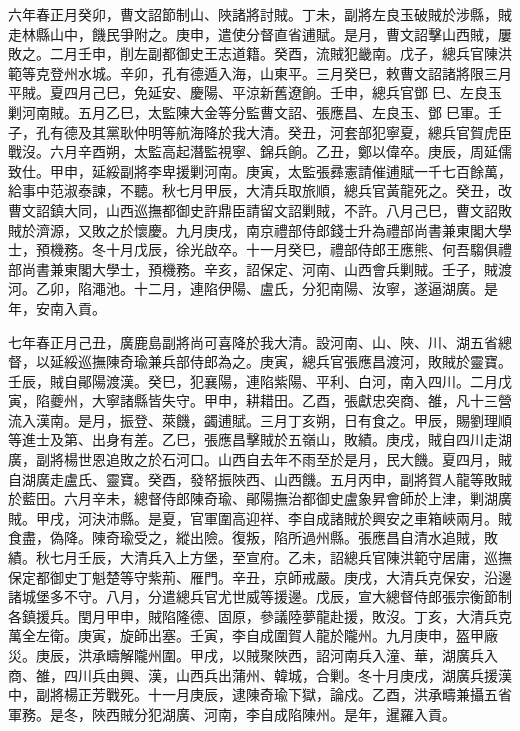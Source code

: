 \begin{pinyinscope}
六年春正月癸卯，曹文詔節制山、陜諸將討賊。丁未，副將左良玉破賊於涉縣，賊走林縣山中，饑民爭附之。庚申，遣使分督直省逋賦。是月，曹文詔擊山西賊，屢敗之。二月壬申，削左副都御史王志道籍。癸酉，流賊犯畿南。戊子，總兵官陳洪範等克登州水城。辛卯，孔有德遁入海，山東平。三月癸巳，敕曹文詔諸將限三月平賊。夏四月己巳，免延安、慶陽、平涼新舊遼餉。壬申，總兵官鄧巳、左良玉剿河南賊。五月乙巳，太監陳大金等分監曹文詔、張應昌、左良玉、鄧巳軍。壬子，孔有德及其黨耿仲明等航海降於我大清。癸丑，河套部犯寧夏，總兵官賀虎臣戰沒。六月辛酉朔，太監高起潛監視寧、錦兵餉。乙丑，鄭以偉卒。庚辰，周延儒致仕。甲申，延綏副將李卑援剿河南。庚寅，太監張彞憲請催逋賦一千七百餘萬，給事中范淑泰諫，不聽。秋七月甲辰，大清兵取旅順，總兵官黃龍死之。癸丑，改曹文詔鎮大同，山西巡撫都御史許鼎臣請留文詔剿賊，不許。八月己巳，曹文詔敗賊於濟源，又敗之於懷慶。九月庚戌，南京禮部侍郎錢士升為禮部尚書兼東閣大學士，預機務。冬十月戊辰，徐光啟卒。十一月癸巳，禮部侍郎王應熊、何吾騶俱禮部尚書兼東閣大學士，預機務。辛亥，詔保定、河南、山西會兵剿賊。壬子，賊渡河。乙卯，陷澠池。十二月，連陷伊陽、盧氏，分犯南陽、汝寧，遂逼湖廣。是年，安南入貢。

七年春正月己丑，廣鹿島副將尚可喜降於我大清。設河南、山、陜、川、湖五省總督，以延綏巡撫陳奇瑜兼兵部侍郎為之。庚寅，總兵官張應昌渡河，敗賊於靈寶。壬辰，賊自鄖陽渡漢。癸巳，犯襄陽，連陷紫陽、平利、白河，南入四川。二月戊寅，陷夔州，大寧諸縣皆失守。甲申，耕耤田。乙酉，張獻忠突商、雒，凡十三營流入漢南。是月，振登、萊饑，蠲逋賦。三月丁亥朔，日有食之。甲辰，賜劉理順等進士及第、出身有差。乙巳，張應昌擊賊於五嶺山，敗績。庚戌，賊自四川走湖廣，副將楊世恩追敗之於石河口。山西自去年不雨至於是月，民大饑。夏四月，賊自湖廣走盧氏、靈寶。癸酉，發帑振陜西、山西饑。五月丙申，副將賀人龍等敗賊於藍田。六月辛未，總督侍郎陳奇瑜、鄖陽撫治都御史盧象昇會師於上津，剿湖廣賊。甲戌，河決沛縣。是夏，官軍圍高迎祥、李自成諸賊於興安之車箱峽兩月。賊食盡，偽降。陳奇瑜受之，縱出險。復叛，陷所過州縣。張應昌自清水追賊，敗績。秋七月壬辰，大清兵入上方堡，至宣府。乙未，詔總兵官陳洪範守居庸，巡撫保定都御史丁魁楚等守紫荊、雁門。辛丑，京師戒嚴。庚戌，大清兵克保安，沿邊諸城堡多不守。八月，分遣總兵官尤世威等援邊。戊辰，宣大總督侍郎張宗衡節制各鎮援兵。閏月甲申，賊陷隆德、固原，參議陸夢龍赴援，敗沒。丁亥，大清兵克萬全左衛。庚寅，旋師出塞。壬寅，李自成圍賀人龍於隴州。九月庚申，盔甲廠災。庚辰，洪承疇解隴州圍。甲戌，以賊聚陜西，詔河南兵入潼、華，湖廣兵入商、雒，四川兵由興、漢，山西兵出蒲州、韓城，合剿。冬十月庚戌，湖廣兵援漢中，副將楊正芳戰死。十一月庚辰，逮陳奇瑜下獄，論戍。乙酉，洪承疇兼攝五省軍務。是冬，陜西賊分犯湖廣、河南，李自成陷陳州。是年，暹羅入貢。


\end{pinyinscope}
